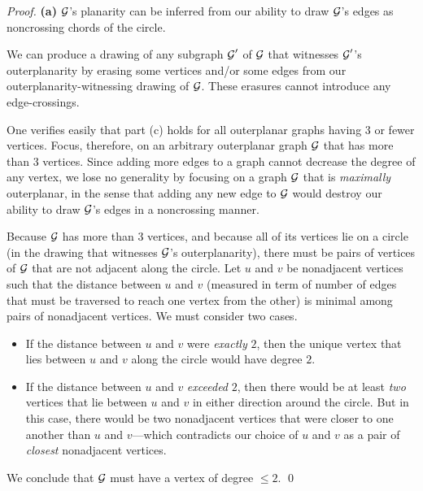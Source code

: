 \begin{proof}
{\bf (a)}
$\mbox{$\cal G$}$'s planarity can be inferred from our ability to draw $\mbox{$\cal G$}$'s edges as noncrossing 
chords of the circle.

\medskip
{}

We can produce a drawing of any subgraph  $\mbox{$\cal G$}'$ of $\mbox{$\cal G$}$ that witnesses $\mbox{$\cal G$}'$'s outerplanarity 
by erasing some vertices and/or some edges from our outerplanarity-witnessing drawing
of $\mbox{$\cal G$}$.  These erasures cannot introduce any edge-crossings.

\medskip

One verifies easily that part (c) holds for all outerplanar graphs having $3$ or fewer vertices.
Focus, therefore, on an arbitrary outerplanar graph $\mbox{$\cal G$}$ that has more than $3$ vertices.  Since
adding more edges to a graph cannot decrease the degree of any vertex, we lose no generality
by focusing on a graph $\mbox{$\cal G$}$ that is {\em maximally} outerplanar,  in the sense that adding any
new edge to $\mbox{$\cal G$}$ would destroy our ability to draw $\mbox{$\cal G$}$'s edges in a noncrossing manner.

Because $\mbox{$\cal G$}$ has more than $3$ vertices, and because all of its vertices lie on a circle
(in the drawing that witnesses $\mbox{$\cal G$}$'s outerplanarity), there must be pairs of vertices of 
$\mbox{$\cal G$}$ that are not adjacent along the circle.  Let $u$ and $v$ be nonadjacent vertices such 
that the distance between $u$ and $v$ (measured in term of number of edges that must 
be traversed to reach one vertex from the other) is minimal among pairs of nonadjacent 
vertices.  We must consider two cases.
\begin{itemize}
\item
If the distance between $u$ and $v$ were {\em exactly} $2$, then the unique vertex
that lies between $u$ and $v$ along the circle would have degree $2$.
\item
If the distance between $u$ and $v$ {\em exceeded} $2$, then there would be at least
{\em two} vertices that lie between $u$ and $v$ in either direction around the circle.
But in this case, there would be two nonadjacent vertices that were closer to one another
than $u$ and $v$---which contradicts our choice of $u$ and $v$ as a pair of {\em closest}
nonadjacent vertices.
\end{itemize}
We conclude that $\mbox{$\cal G$}$ must have a vertex of degree $\leq 2$.  \qed
\end{proof}

